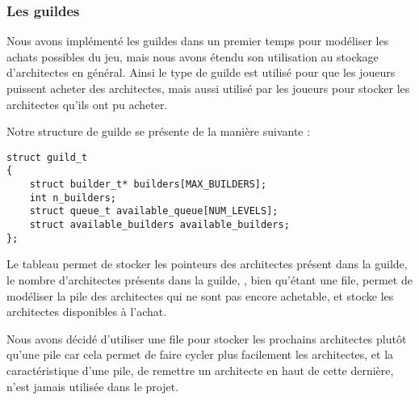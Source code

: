 
\subsubsection{Les guildes}
\label{guild}

Nous avons implémenté les guildes dans un premier temps pour modéliser les achats possibles du jeu, mais nous avons étendu son utilisation au stockage d'architectes en général. Ainsi le type de guilde est utilisé pour que les joueurs puissent acheter des architectes, mais aussi utilisé par les joueurs pour stocker les architectes qu'ils ont pu acheter.

Notre structure de guilde se présente de la manière suivante :

\begin{lstlisting}[frame=single, caption={Implémentation du type struct guild\_t}]
struct guild_t
{
	struct builder_t* builders[MAX_BUILDERS];
	int n_builders;
	struct queue_t available_queue[NUM_LEVELS];
	struct available_builders available_builders;
};
\end{lstlisting}

Le tableau  permet de stocker les pointeurs  des architectes présent dans la guilde,  le nombre d'architectes présents dans la guilde, , bien qu'étant une file, permet de modéliser la pile des architectes qui ne sont pas encore achetable, et  stocke les architectes disponibles à l'achat.

\begin{summary}
Nous avons décidé d'utiliser une file pour stocker les prochains architectes plutôt qu'une pile car cela permet de faire cycler plus facilement les architectes, et la caractéristique d'une pile, de remettre un architecte en haut de cette dernière, n'est jamais utilisée dans le projet.
\end{summary}


